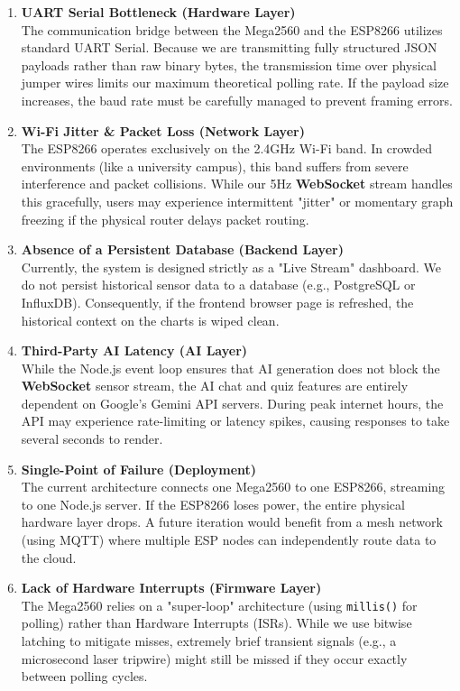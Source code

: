 \documentclass[12pt,a4paper]{article}
\newcommand{\keyword}[1]{\textcolor{keywordcolor}{\textbf{#1}}}
\newcommand{\Q}[1]{\textcolor{questioncolor}{\textbf{#1}}}
\begin{document}
\begin{enumerate}
    \item \Q{UART Serial Bottleneck (Hardware Layer)} \\
    The communication bridge between the Mega2560 and the ESP8266 utilizes standard UART Serial. Because we are transmitting fully structured JSON payloads rather than raw binary bytes, the transmission time over physical jumper wires limits our maximum theoretical polling rate. If the payload size increases, the baud rate must be carefully managed to prevent framing errors.

    \item \Q{Wi-Fi Jitter \& Packet Loss (Network Layer)} \\
    The ESP8266 operates exclusively on the 2.4GHz Wi-Fi band. In crowded environments (like a university campus), this band suffers from severe interference and packet collisions. While our 5Hz \keyword{WebSocket} stream handles this gracefully, users may experience intermittent "jitter" or momentary graph freezing if the physical router delays packet routing.

    \item \Q{Absence of a Persistent Database (Backend Layer)} \\
    Currently, the system is designed strictly as a "Live Stream" dashboard. We do not persist historical sensor data to a database (e.g., PostgreSQL or InfluxDB). Consequently, if the frontend browser page is refreshed, the historical context on the charts is wiped clean. 

    \item \Q{Third-Party AI Latency (AI Layer)} \\
    While the Node.js event loop ensures that AI generation does not block the \keyword{WebSocket} sensor stream, the AI chat and quiz features are entirely dependent on Google's Gemini API servers. During peak internet hours, the API may experience rate-limiting or latency spikes, causing responses to take several seconds to render.
    
    \item \Q{Single-Point of Failure (Deployment)} \\
    The current architecture connects one Mega2560 to one ESP8266, streaming to one Node.js server. If the ESP8266 loses power, the entire physical hardware layer drops. A future iteration would benefit from a mesh network (using MQTT) where multiple ESP nodes can independently route data to the cloud.
    \item \Q{Lack of Hardware Interrupts (Firmware Layer)} \\
    The Mega2560 relies on a "super-loop" architecture (using \texttt{millis()} for polling) rather than Hardware Interrupts (ISRs). While we use bitwise latching to mitigate misses, extremely brief transient signals (e.g., a microsecond laser tripwire) might still be missed if they occur exactly between polling cycles.


\end{enumerate}
\end{document}
